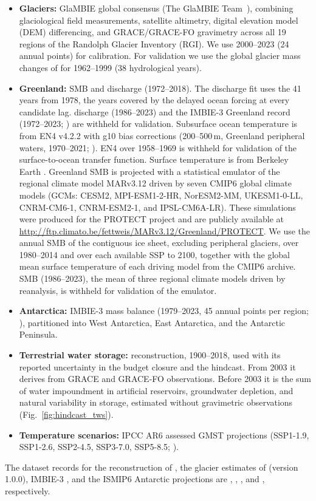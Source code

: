\documentclass[12pt]{article}
\begin{document}
\begin{itemize}
\item \textbf{Glaciers:} GlaMBIE global consensus (The GlaMBIE Team~\citeyear{GlaMBIE2025}), combining glaciological field measurements, satellite altimetry, digital elevation model (DEM) differencing, and GRACE/GRACE-FO gravimetry across all 19 regions of the Randolph Glacier Inventory (RGI). We use 2000--2023 (24 annual points) for calibration. For validation we use the global glacier mass changes of \citet{Zemp2019} for 1962--1999 (38 hydrological years).
\item \textbf{Greenland:} \citet{Mouginot2019} SMB and discharge (1972--2018). The discharge fit uses the 41 years from 1978, the years covered by the delayed ocean forcing at every candidate lag. \citet{Mankoff2021} discharge (1986--2023) and the IMBIE-3 Greenland record (1972--2023; \citealp{Otosaka2026}) are withheld for validation. Subsurface ocean temperature is from EN4 v4.2.2 with g10 bias corrections (200--500\,m, Greenland peripheral waters, 1970--2021; \citealp{Good2013}). EN4 over 1958--1969 is withheld for validation of the surface-to-ocean transfer function. Surface temperature is from Berkeley Earth \citep{Rohde2020}. Greenland SMB is projected with a statistical emulator of the regional climate model MARv3.12 driven by seven CMIP6 global climate models (GCMs: CESM2, MPI-ESM1-2-HR, NorESM2-MM, UKESM1-0-LL, CNRM-CM6-1, CNRM-ESM2-1, and IPSL-CM6A-LR). These simulations were produced for the PROTECT project \citep{Boberg2026} and are publicly available at \url{http://ftp.climato.be/fettweis/MARv3.12/Greenland/PROTECT}. We use the annual SMB of the contiguous ice sheet, excluding peripheral glaciers, over 1980--2014 and over each available SSP to 2100, together with the global mean surface temperature of each driving model from the CMIP6 archive. \citet{Mankoff2021} SMB (1986--2023), the mean of three regional climate models driven by reanalysis, is withheld for validation of the emulator.
\item \textbf{Antarctica:} IMBIE-3 mass balance (1979--2023, 45 annual points per region; \citealp{Otosaka2026}), partitioned into West Antarctica, East Antarctica, and the Antarctic Peninsula.
\item \textbf{Terrestrial water storage:} \citet{Frederikse2020} reconstruction, 1900--2018, used with its reported uncertainty in the budget closure and the hindcast. From 2003 it derives from GRACE and GRACE-FO observations. Before 2003 it is the sum of water impoundment in artificial reservoirs, groundwater depletion, and natural variability in storage, estimated without gravimetric observations (Fig.~\ref{fig:hindcast_tws}). 
\item \textbf{Temperature scenarios:} IPCC AR6 assessed GMST projections (SSP1-1.9, SSP1-2.6, SSP2-4.5, SSP3-7.0, SSP5-8.5; \citealp{Lee2021}).
\end{itemize}
The dataset records for the reconstruction of \citet{Frederikse2020}, the glacier estimates of \citet{Zemp2019} (version 1.0.0), IMBIE-3 \citep{Otosaka2026}, and the ISMIP6 Antarctic projections \citep{Seroussi2020} are \citet{Frederikse2020data}, \citet{Zemp2019data}, \citet{Otosaka2026data}, and \citet{Seroussi2020data}, respectively.
\end{document}

